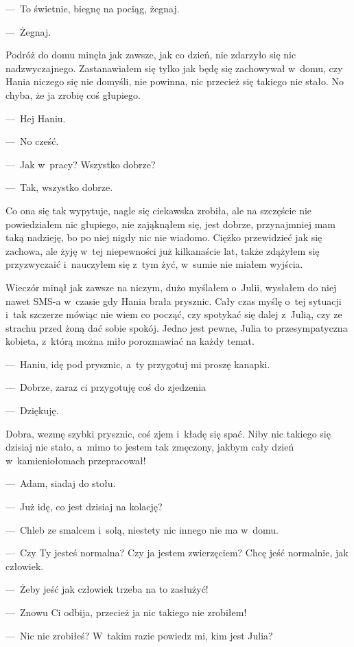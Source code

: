 ---~To świetnie, biegnę na pociąg, żegnaj.

---~Żegnaj.

Podróż do domu minęła jak zawsze, jak co dzień, nie zdarzyło się nic nadzwyczajnego. Zastanawiałem się tylko jak będę się zachowywał w~domu, czy Hania niczego się nie domyśli, nie powinna, nic przecież się takiego nie stało. No chyba, że ja zrobię coś głupiego.

---~Hej Haniu.

---~No cześć.

---~Jak w~pracy? Wszystko dobrze?

---~Tak, wszystko dobrze.

Co ona się tak wypytuje, nagle się ciekawska zrobiła, ale na szczęście nie powiedziałem nic głupiego, nie zająknąłem się, jest dobrze, przynajmniej mam taką nadzieję, bo po niej nigdy nic nie wiadomo. Ciężko przewidzieć jak się zachowa, ale żyję w~tej niepewności już kilkanaście lat, także zdążyłem się przyzwyczaić i~nauczyłem się z~tym żyć, w~sumie nie miałem wyjścia.

Wieczór minął jak zawsze na niczym, dużo myślałem o~Julii, wysłałem do niej nawet SMS-a w~czasie gdy Hania brała prysznic. Cały czas myślę o~tej sytuacji i~tak szczerze mówiąc nie wiem co począć, czy spotykać się dalej z~Julią, czy ze strachu przed żoną dać sobie spokój. Jedno jest pewne, Julia to przesympatyczna kobieta, z~którą można miło porozmawiać na każdy temat.

---~Haniu, idę pod prysznic, a~ty przygotuj mi proszę kanapki.

---~Dobrze, zaraz ci przygotuję coś do zjedzenia

---~Dziękuję.

Dobra, wezmę szybki prysznic, coś zjem i~kładę się spać. Niby nic takiego się dzisiaj nie stało, a~mimo to jestem tak zmęczony, jakbym cały dzień w~kamieniołomach przepracował!

---~Adam, siadaj do stołu.

---~Już idę, co jest dzisiaj na kolację?

---~Chleb ze smalcem i~solą, niestety nic innego nie ma w~domu.

---~Czy Ty jesteś normalna? Czy ja jestem zwierzęciem? Chcę jeść normalnie, jak człowiek.

---~Żeby jeść jak człowiek trzeba na to zasłużyć!

---~Znowu Ci odbija, przecież ja nic takiego nie zrobiłem!

---~Nic nie zrobiłeś? W~takim razie powiedz mi, kim jest Julia?


